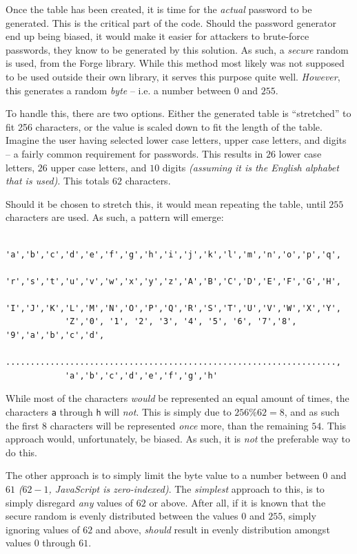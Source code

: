 		Once the table has been created, it is time for the \emph{actual} password to be generated. This is the critical part of the code. Should the password generator end up being biased, it would make it easier for attackers to brute-force passwords, they know to be generated by this solution. As such, a \emph{secure} random is used, from the Forge library. While this method most likely was not supposed to be used outside their own library, it serves this purpose quite well. \emph{However}, this generates a random \emph{byte} -- i.e. a number between $0$ and $255$.

		To handle this, there are two options. Either the generated table is ``stretched'' to fit 256 characters, or the value is scaled down to fit the length of the table. Imagine the user having selected lower case letters, upper case letters, and digits -- a fairly common requirement for passwords. This results in $26$ lower case letters, $26$ upper case letters, and $10$ digits \emph{(assuming it is the English alphabet that is used)}. This totals $62$ characters.

		Should it be chosen to stretch this, it would mean repeating the table, until $255$ characters are used. As such, a pattern will emerge:
		\begin{verbatim}
			'a','b','c','d','e','f','g','h','i','j','k','l','m','n','o','p','q',
			'r','s','t','u','v','w','x','y','z','A','B','C','D','E','F','G','H',
			'I','J','K','L','M','N','O','P','Q','R','S','T','U','V','W','X','Y',
			'Z','0', '1', '2', '3', '4', '5', '6', '7','8', '9','a','b','c','d',
			...................................................................,
			'a','b','c','d','e','f','g','h'
		\end{verbatim}
		While most of the characters \emph{would} be represented an equal amount of times, the characters \verb=a= through \verb=h= will \emph{not}. This is simply due to $256\%62=8$, and as such the first $8$ characters will be represented \emph{once} more, than the remaining $54$. This approach would, unfortunately, be biased. As such, it is \emph{not} the preferable way to do this.

		The other approach is to simply limit the byte value to a number between $0$ and $61$ \emph{($62-1$, JavaScript is zero-indexed)}. The \emph{simplest} approach to this, is to simply disregard \emph{any} values of $62$ or above. After all, if it is known that the secure random is evenly distributed between the values $0$ and $255$, simply ignoring values of $62$ and above, \emph{should} result in evenly distribution amongst values $0$ through $61$. 

